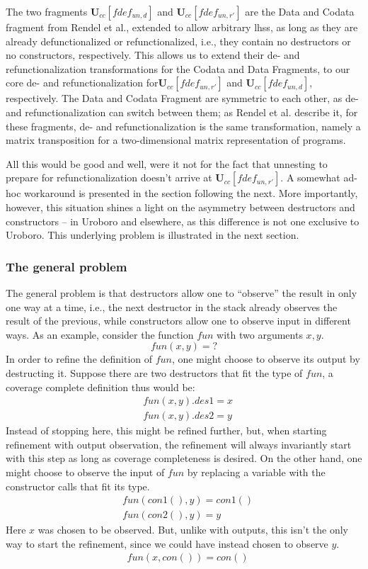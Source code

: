 The two fragments $\mathbf{U}_{cc}[fdef_{un,d}]$ and $\mathbf{U}_{cc}[fdef_{un,r'}]$ are the Data and Codata fragment from Rendel et al., extended to allow arbitrary lhss, as long as they are already defunctionalized or refunctionalized, i.e., they contain no destructors or no constructors, respectively. This allows us to extend their de- and refunctionalization transformations for the Codata and Data Fragments, to our core de- and refunctionalization for$\mathbf{U}_{cc}[fdef_{un,r'}]$ and $\mathbf{U}_{cc}[fdef_{un,d}]$, respectively. The Data and Codata Fragment are symmetric to each other, as de- and refunctionalization can switch between them; as Rendel et al.\cite{rendel15automatic} describe it, for these fragments, de- and refunctionalization is the same transformation, namely a matrix transposition for a two-dimensional matrix representation of programs.

All this would be good and well, were it not for the fact that unnesting to prepare for refunctionalization doesn't arrive at $\mathbf{U}_{cc}[fdef_{un,r'}]$. A somewhat ad-hoc workaround is presented in the section following the next. More importantly, however, this situation shines a light on the asymmetry between destructors and constructors -- in Uroboro and elsewhere, as this difference is not one exclusive to Uroboro. This underlying problem is illustrated in the next section.

\subsubsection{The general problem}

The general problem is that destructors allow one to ``observe'' the result in only one way at a time, i.e., the next destructor in the stack already observes the result of the previous, while constructors allow one to observe input in different ways. As an example, consider the function $fun$ with two arguments $x, y$.
\[
fun(x, y) = ?
\]
In order to refine the definition of $fun$, one might choose to observe its output by destructing it. Suppose there are two destructors that fit the type of $fun$, a coverage complete definition thus would be:
\begin{align*}
& fun(x, y).des1 = x \\
& fun(x, y).des2 = y
\end{align*}
Instead of stopping here, this might be refined further, but, when starting refinement with output observation, the refinement will always invariantly start with this step as long as coverage completeness is desired. On the other hand, one might choose to observe the input of $fun$ by replacing a variable with the constructor calls that fit its type.
\begin{align*}
& fun(con1(), y) = con1() \\
& fun(con2(), y) = y
\end{align*}
Here $x$ was chosen to be observed. But, unlike with outputs, this isn't the only way to start the refinement, since we could have instead chosen to observe $y$.
\begin{align*}
& fun(x, con()) = con() \\
\end{align*}

